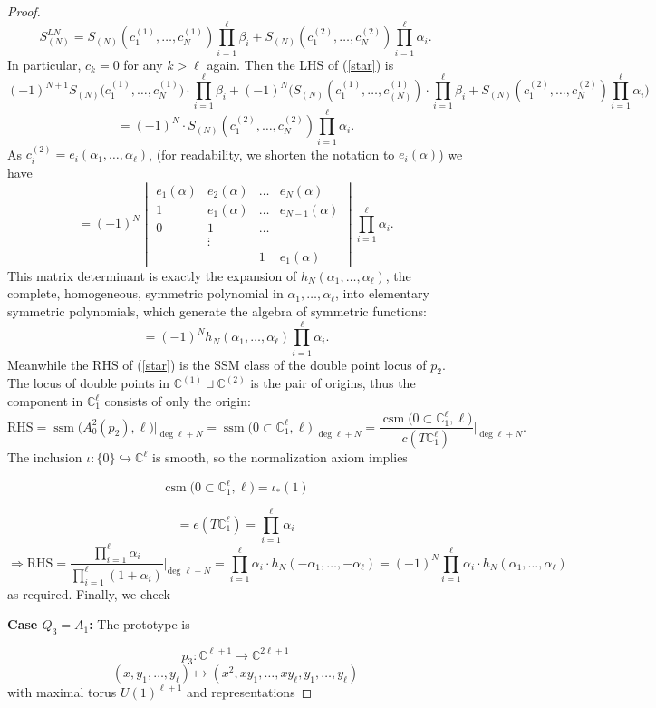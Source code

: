 \documentclass[11pt]{article}
\theoremstyle{plain}
\theoremstyle{definition}
\theoremstyle{definition}
\newcommand{\C}{\mathbb{C}}
\DeclareMathOperator{\csm}{csm}
\DeclareMathOperator{\ssm}{ssm}
\begin{document}
\begin{proof}
\[
S^{LN}_{(N)}=S_{(N)}\left(c^{(1)}_1,\dots,c_N^{(1)}\right)\prod_{i=1}^\ell\beta_i + S_{(N)}\left(c^{(2)}_1,\dots,c^{(2)}_N\right)\prod_{i=1}^\ell\alpha_i.
\]
In particular, $c_k=0$ for any $k>\ell$ again. Then the LHS of (\ref{star}) is 
\[
(-1)^{N+1}S_{(N)}\Big(c_1^{(1)},\dots,c_N^{(1)}\Big) \cdot\prod_{i=1}^{\ell}\beta_i+ (-1)^{N}\Big( S_{(N)}(c_1^{(1)},\dots,c_{(N)}^{(1)})\cdot\prod_{i=1}^{\ell}\beta_i+S_{(N)}\left(c^{(2)}_1,\dots,c^{(2)}_N\right)\prod_{i=1}^\ell\alpha_i\Big)
\]
\[
=(-1)^N\cdot S_{(N)}\left(c^{(2)}_1,\dots,c^{(2)}_N\right)\prod_{i=1}^\ell\alpha_i.
\]
As $c_i^{(2)}=e_i(\alpha_1,\dots,\alpha_\ell)$, (for readability, we shorten the notation to $e_i(\alpha)$) we have 
\[
=(-1)^N \begin{vmatrix}e_1(\alpha) & e_2(\alpha) & \dots&e_N(\alpha)\\ 1 & e_1(\alpha) & \dots&e_{N-1}(\alpha)\\0&1&\dots\\ & \vdots & \\
&&1&e_1(\alpha)\end{vmatrix}\prod_{i=1}^\ell \alpha_i.
\]
This matrix determinant is exactly the expansion of $h_N(\alpha_1,\dots,\alpha_\ell)$, the complete, homogeneous, symmetric polynomial in $\alpha_1,\dots,\alpha_\ell$, into elementary symmetric polynomials, which generate the algebra of symmetric functions:
\[
=(-1)^Nh_N(\alpha_1,\dots,\alpha_\ell)\prod_{i=1}^\ell\alpha_i.
\]
Meanwhile the RHS of (\ref{star}) is the SSM class of the double point locus of $p_2$. The locus of double points in $\C^{(1)}\sqcup \C^{(2)}$ is the pair of origins, thus the component in $\C^\ell_1$ consists of only the origin:
\[
\text{RHS} = \ssm\Big(A_0^2(p_2),\ell\Big)\Big|_{\deg \ell+N}=\ssm\big(0\subset \C^\ell_1,\ell\big)\Big|_{\deg \ell+N}=\frac{\csm\big(0\subset\C_1^\ell,\ell\big)}{c(T\C_1^\ell)}\Bigg|_{\deg \ell+N}.
\]
The inclusion $\iota:\{0\}\hookrightarrow \C^\ell$ is smooth, so the normalization axiom implies

\[
\csm\big(0\subset\C_1^\ell,\ell\big) = \iota_*(1)
\]

\[
=e(T\C^\ell_1)=\prod_{i=1}^{\ell}\alpha_i
\]
\[
\Rightarrow \text{RHS} =\frac{\prod_{i=1}^\ell\alpha_i}{\prod_{i=1}^\ell(1+\alpha_i)}\Bigg|_{\text{deg }\ell+N}=\prod_{i=1}^\ell\alpha_i \cdot h_N(-\alpha_1,\dots,-\alpha_\ell) = (-1)^N\prod_{i=1}^\ell\alpha_i\cdot h_N(\alpha_1,\dots,\alpha_\ell)
\]
as required. Finally, we check

\textbf{Case $Q_3 = A_1$:} The prototype is

\[
p_3 : \C^{\ell+1}\to \C^{2\ell+1}
\]
\[
(x,y_1,\dots,y_\ell)\mapsto (x^2,xy_1,\dots,xy_\ell,y_1,\dots,y_\ell)
\]
with maximal torus $U(1)^{\ell+1}$ and representations 


\end{proof}
\end{document}
